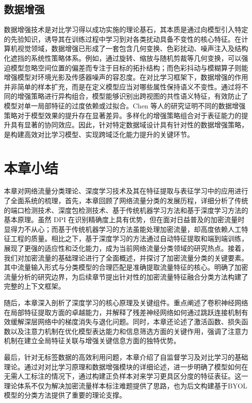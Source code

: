 \subsection{数据增强}
数据增强技术是对比学习得以成功实施的理论基石，其本质是通过向模型引入特定的先验知识，诱导其在训练过程中学习到对各类扰动具备不变性的核心特征。在计算机视觉领域，数据增强已形成了一套包含几何变换、色彩扰动、噪声注入及结构化遮挡的系统性策略体系\cite{shorten2019survey}。例如，通过旋转、缩放与随机剪裁等几何变换，可以强迫模型忽略空间位置的偏差而专注于目标的拓扑结构；而色彩抖动与模糊算子则能增强模型对环境光影及传感器噪声的容忍度。在对比学习框架下，数据增强的作用并非简单的样本扩充，而是在定义模型应当对哪些属性保持语义不变性。通过将不同的增强策略进行异构组合，模型能够识别出跨视图的共性语义特征，有效防止了模型对单一局部特征的过度依赖或过拟合。Chen 等人的研究证明不同的数据增强策略对于模型效果的提升存在显著差异\cite{chen2020simple}。多样化的增强策略组合对于表征能力的提升具有显著的协同效应。因此，针对特定数据域设计具有针对性的数据增强策略，是构建高效对比学习模型、实现跨域泛化能力提升的关键环节。

\section{本章小结}
本章对网络流量分类理论、深度学习技术及其在特征提取与表征学习中的应用进行了全面系统的梳理，首先，本章回顾了网络流量分类的发展历程，详细分析了传统的端口检测技术、深度包检测技术、基于传统机器学习方法和基于深度学习方法的基本原理。虽然 DPI 在识别精确度上具有优势，但在面对日益普及的加密流量时显得力不从心；而基于传统机器学习的方法虽能处理加密流量，却高度依赖人工特征工程的质量。相比之下，基于深度学习的方法通过自动特征提取和端到端训练，展现了更强的适应性和泛化能力，成为当前网络流量分类领域的研究热点。接着，我们对加密流量的基础理论进行了全面概述，并探讨了加密流量分类的关键要素。其中流量输入形式与分类模型的合理匹配是准确提取流量特征的核心。明确了加密流量分析的研究边界，为后续章节提出针对性的加密流量特征融合分类方法构建了完整的上下文框架。

随后，本章深入剖析了深度学习的核心原理及关键组件。重点阐述了卷积神经网络在局部特征提取方面的卓越能力，并解释了残差神经网络如何通过跳跃连接机制有效缓解深层网络中的梯度消失与退化问题。同时，本章还论述了激活函数、损失函数以及注意力机制在优化模型表达能力和信息筛选方面的关键作用，强调了注意力机制在建立全局特征关联与增强关键信息方面的独特优势。

最后，针对无标签数据的高效利用问题，本章介绍了自监督学习及对比学习的基础理论。通过对对比学习原理和数据增强模块的详细论述，进一步明确了模型如何在无需人工标注的情况下，通过构建正负样本对来学习更具区分度的特征表征。这一理论体系不仅为解决加密流量样本标注难题提供了思路，也为后文构建基于BYOL模型的分类方法提供了重要的理论支撑。